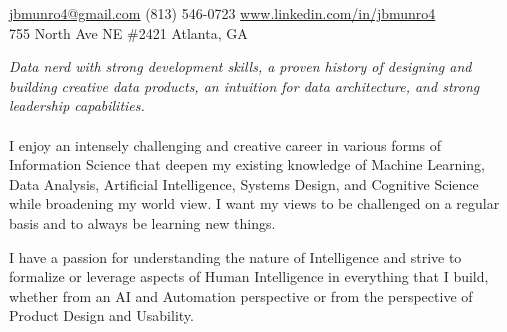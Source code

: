\documentclass[10pt,a4paper]{article}
\begin{document}
\sloppy  %



\nobreakvspace{0.3em}  %

\noindent\href{mailto:jbmunro4.at.gmail.dot.com}{jbmunro4\mbox{}@\mbox{}gmail.com}\sbull
\textsmaller(813) 546-0723\sbull
\href{http://www.linkedin.com/in/jbmunro4}{www.linkedin.com/in/jbmunro4}
\\
755 North Ave NE \#2421\sbull
Atlanta, GA

\spacedhrule{0.9em}{-0.4em}  %


\vspace{-1.3em}  %
\begin{multicols}{2}  %
\noindent \emph{Data nerd with strong development skills, a proven history of designing and building creative data products, an intuition for data architecture, and strong leadership capabilities.}
\\
\\
I enjoy an intensely challenging and creative career in various forms of Information Science that deepen my existing knowledge of Machine Learning, Data Analysis, Artificial Intelligence, Systems Design, and Cognitive Science while broadening my world view. I want my views to be challenged on a regular basis and to always be learning new things.

I have a passion for understanding the nature of \mbox{Intelligence} and strive to formalize or leverage aspects of Human Intelligence in everything that I build, whether from an AI and Automation perspective or from the perspective of Product Design and Usability.
\end{multicols}


\spacedhrule{0em}{-0.4em}

\end{document}
